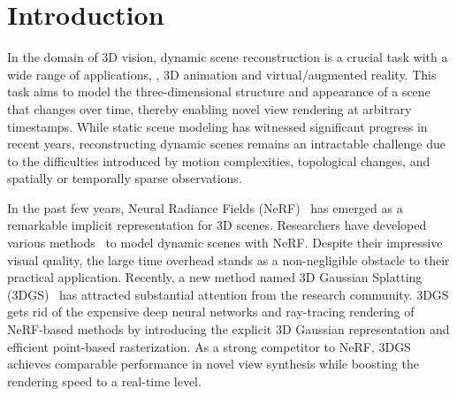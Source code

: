 \documentclass[runningheads]{llncs}
\begin{document}
\begin{abstract}
  3D Gaussian Splatting (3DGS) has become an emerging tool for dynamic scene reconstruction. However, existing methods focus mainly on extending static 3DGS into a time-variant representation, while overlooking the rich motion information carried by 2D observations, thus suffering from performance degradation and model redundancy.
  To address the above problem, we propose a novel motion-aware enhancement framework for dynamic scene reconstruction, which mines useful motion cues from optical flow to improve different paradigms of dynamic 3DGS.
  Specifically, we first establish a correspondence between 3D Gaussian movements and pixel-level flow.
  Then a novel flow augmentation method is introduced with additional insights into uncertainty and loss collaboration.
  Moreover, for the prevalent deformation-based paradigm that presents a harder optimization problem, a transient-aware deformation auxiliary module is proposed.
  We conduct extensive experiments on both multi-view and monocular scenes to verify the merits of our work.
  Compared with the baselines, our method shows significant superiority in both rendering quality and efficiency.

\end{abstract}


\section{Introduction}
\label{sec:intro}

In the domain of 3D vision, dynamic scene reconstruction is a crucial task with a wide range of applications, \eg, 3D animation and virtual/augmented reality. 
This task aims to model the three-dimensional structure and appearance of a scene that changes over time, thereby enabling novel view rendering at arbitrary timestamps.
While static scene modeling has witnessed significant progress in recent years, reconstructing dynamic scenes remains an intractable challenge due to the difficulties introduced by motion complexities, topological changes, and spatially or temporally sparse observations.

In the past few years, Neural Radiance Fields (NeRF)~\cite{nerf} has emerged as a remarkable implicit representation for 3D scenes. Researchers have developed various methods~\cite{dnerf,nerfies,hypernerf,nsff,du2021neural,attal2021torf,noguchi2021neural,hexplane} to model dynamic scenes with NeRF. Despite their impressive visual quality, the large time overhead stands as a non-negligible obstacle to their practical application.
Recently, a new method named 3D Gaussian Splatting (3DGS)~\cite{3dgs} has attracted substantial attention from the research community. 
3DGS gets rid of the expensive deep neural networks and ray-tracing rendering of NeRF-based methods by introducing the explicit 3D Gaussian representation and efficient point-based rasterization. 
As a strong competitor to NeRF, 3DGS achieves comparable performance in novel view synthesis while boosting the rendering speed to a real-time level.
\end{document}

